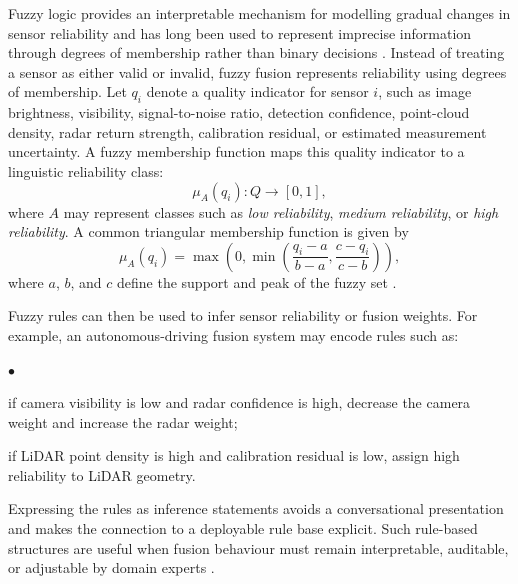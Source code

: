 \documentclass[11pt,oneside,openany]{book}
\newenvironment{list4a}{
  \begin{list}{$\bullet$}{%
      \setlength{\itemsep}{0.05cm}
      \setlength{\labelsep}{0.2cm}
      \setlength{\labelwidth}{0.3cm}
      \setlength{\parsep}{0in}
      \setlength{\parskip}{0in}
      \setlength{\topsep}{0in}
      \setlength{\partopsep}{0in}
      \setlength{\leftmargin}{0.16in}}}
      {\end{list}}
\begin{document}
Fuzzy logic provides an interpretable mechanism for modelling gradual changes in sensor reliability and has long been used to represent imprecise information through degrees of membership rather than binary decisions \cite{zadeh_fuzzy_1965}. Instead of treating a sensor as either valid or invalid, fuzzy fusion represents reliability using degrees of membership. Let $q_i$ denote a quality indicator for sensor $i$, such as image brightness, visibility, signal-to-noise ratio, detection confidence, point-cloud density, radar return strength, calibration residual, or estimated measurement uncertainty. A fuzzy membership function maps this quality indicator to a linguistic reliability class:
\begin{equation}
    \mu_A(q_i): Q \rightarrow [0,1],
\end{equation}
where $A$ may represent classes such as \emph{low reliability}, \emph{medium reliability}, or \emph{high reliability}. A common triangular membership function is given by
\begin{equation}
    \mu_A(q_i) =
    \max\left(0,
    \min\left(
    \frac{q_i-a}{b-a},
    \frac{c-q_i}{c-b}
    \right)\right),
\end{equation}
where $a$, $b$, and $c$ define the support and peak of the fuzzy set \cite{zadeh_fuzzy_1965}.

Fuzzy rules can then be used to infer sensor reliability or fusion weights. For example, an autonomous-driving fusion system may encode rules such as:
\begin{list4a}
    \item if camera visibility is low and radar confidence is high, decrease the camera weight and increase the radar weight;
    \item if LiDAR point density is high and calibration residual is low, assign high reliability to LiDAR geometry.
\end{list4a}
Expressing the rules as inference statements avoids a conversational presentation and makes the connection to a deployable rule base explicit. Such rule-based structures are useful when fusion behaviour must remain interpretable, auditable, or adjustable by domain experts \cite{zadeh_fuzzy_1965, khaleghi_multisensor_2013}.
\end{document}
